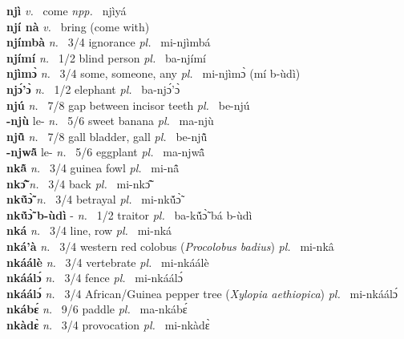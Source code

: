 {\bfseries njì}  {\itshape v.~} come   {\itshape npp.~} njìyá  \\ 
{\bfseries njí nà}  {\itshape v.~} bring (come with)    \\ 
{\bfseries njímbà}  {\itshape n.~} 3/4 ignorance {\itshape pl.~} mi-njìmbá    \\ 
{\bfseries njímí}  {\itshape n.~} 1/2 blind person {\itshape pl.~} ba-njímí    \\ 
{\bfseries njìmɔ̀}  {\itshape n.~} 3/4 some, someone, any {\itshape pl.~} mi-njìmɔ̀ (mí b-ùdì)    \\ 
{\bfseries njɔ́'ɔ̀}  {\itshape n.~} 1/2 elephant {\itshape pl.~} ba-njɔ́'ɔ̀    \\ 
{\bfseries njú}  {\itshape n.~} 7/8 gap between incisor teeth {\itshape pl.~} be-njú    \\ 
{\bfseries -njù} le- {\itshape n.~} 5/6 sweet banana {\itshape pl.~} ma-njù    \\ 
{\bfseries njũ̂}  {\itshape n.~} 7/8 gall bladder, gall {\itshape pl.~} be-njũ̂    \\ 
{\bfseries -njwã̂} le- {\itshape n.~} 5/6 eggplant {\itshape pl.~} ma-njwã̂    \\ 
{\bfseries nkã̂}  {\itshape n.~} 3/4 guinea fowl {\itshape pl.~} mi-nã̂    \\ 
{\bfseries nkɔ̃̂}  {\itshape n.~} 3/4 back {\itshape pl.~} mi-nkɔ̃̂    \\ 
{\bfseries nkṹɔ̃̀}  {\itshape n.~} 3/4 betrayal {\itshape pl.~} mi-nkṹɔ̃̀    \\ 
{\bfseries nkṹɔ̃̀ b-ùdì} - {\itshape n.~} 1/2 traitor {\itshape pl.~} ba-kṹɔ̃̀ bá b-ùdì    \\ 
{\bfseries nká}  {\itshape n.~} 3/4 line, row {\itshape pl.~} mi-nká    \\ 
{\bfseries nká'à}  {\itshape n.~} 3/4 western red colobus ({\itshape Procolobus badius}) {\itshape pl.~} mi-nkâ    \\ 
{\bfseries nkáálè}  {\itshape n.~} 3/4 vertebrate {\itshape pl.~} mi-nkáálè    \\ 
{\bfseries nkáálɔ́}  {\itshape n.~} 3/4 fence {\itshape pl.~} mi-nkáálɔ́    \\ 
{\bfseries nkáálɔ́}  {\itshape n.~} 3/4 African/Guinea pepper tree ({\itshape Xylopia aethiopica}) {\itshape pl.~} mi-nkáálɔ́    \\ 
{\bfseries nkábɛ́}  {\itshape n.~} 9/6 paddle {\itshape pl.~} ma-nkábɛ́    \\ 
{\bfseries nkàdɛ̀}  {\itshape n.~} 3/4 provocation {\itshape pl.~} mi-nkàdɛ̀    \\ 
